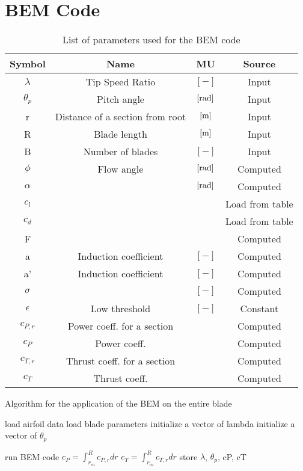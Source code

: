 \section{BEM Code}
\begin{table}[htb]
  \caption{List of parameters used for the BEM code}
  \centering
  \begin{tabular}{cccc}
  \toprule
  Symbol & Name & MU & Source \\ \midrule
  $\lambda$ & Tip Speed Ratio & $\left[-\right]$ & Input \\
  $\theta_p$ & Pitch angle & $\left[\si{\radian}\right]$ & Input \\
  r & Distance of a section from root & $\left[\si{\meter}\right]$ & Input \\
  R & Blade length & $\left[\si{\meter}\right]$ & Input \\
  B & Number of blades & $\left[-\right]$ & Input \\
  $\phi$ & Flow angle & $\left[\si{\radian}\right]$ & Computed \\
  $\alpha$ &  & $\left[\si{\radian}\right]$ & Computed \\
  $c_l$ & & & Load from table\\
  $c_d$ & & & Load from table\\
  F & & & Computed\\
  a & Induction coefficient & $\left[-\right]$ & Computed \\
  a' & Induction coefficient & $\left[-\right]$ & Computed \\
  $\sigma$ & & $\left[-\right]$ & Computed\\
  $\epsilon$ & Low threshold & $\left[-\right]$  & Constant \\
  $c_{P,r}$ & Power coeff. for a section & \textcolor{red}{} & Computed\\
  $c_{P}$ & Power coeff. & \textcolor{red}{} & Computed\\
  $c_{T,r}$ & Thrust coeff. for a section & \textcolor{red}{} & Computed\\
  $c_{T}$ & Thrust coeff. & \textcolor{red}{} & Computed\\
  \bottomrule
  \end{tabular}
  \label{tab:DTU_10_struct}
\end{table}


\begin{algorithm}
\caption{Algorithm for the application of the BEM on the entire blade}\label{alg:MainBEM}
\begin{algorithmic}
\State load airfoil data
\State load blade parameters
\State initialize a vector of lambda
\State initialize a vector of $\theta_p$

    \State run BEM code
    \EndFor 
    \State $c_P = \int_{r_{in}}^{R}c_{P,r}dr$
    \State $c_T = \int_{r_{in}}^{R}c_{T,r}dr$
    \State store $\lambda$, $\theta_p$, cP, cT
 \EndFor
\EndFor 
\end{algorithmic}
\end{algorithm}

